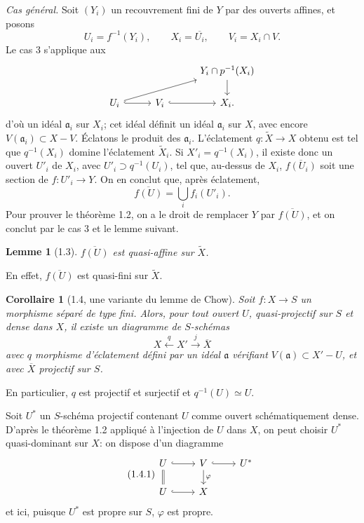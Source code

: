 \documentclass[10pt,a4paper]{article}
\theoremstyle{deligne}
\newtheorem*{lemma*}{Lemme}
\newtheorem*{corollary*}{Corollaire}
\begin{document}
\textit{Cas général.} Soit \((Y_i)\) un recouvrement fini de \(Y\) par des ouverts affines, et posons
\[
U_i=f^{-1}(Y_i),\qquad X_i=\overline{U_i},\qquad V_i=X_i\cap V.
\]
Le cas 3 s'applique aux
\[
\begin{tikzcd}[column sep=2.8em,row sep=1.6em]
&& Y_i\cap p^{-1}(X_i) \arrow[d] \\
U_i \arrow[r,hook] \arrow[urr] & V_i \arrow[r,hook] & X_i .
\end{tikzcd}
\]
d'où un idéal \(\mathfrak a_i\) sur \(X_i\); cet idéal définit un idéal \(\mathfrak a_i\) sur \(X\), avec encore \(V(\mathfrak a_i)\subset X-V\). Éclatons le produit des \(\mathfrak a_i\). L'éclatement \(q:\widetilde X\to X\) obtenu est tel que \(q^{-1}(X_i)\) domine l'éclatement \(\widetilde X_i\). Si \(X'_i=q^{-1}(X_i)\), il existe donc un ouvert \(U'_i\) de \(X_i\), avec \(U'_i\supset q^{-1}(U_i)\), tel que, au-dessus de \(X_i\), \(\overline{f(U_i)}\) soit une section de \(f:U'_i\to Y\). On en conclut que, après éclatement,
\[
\overline{f(U)}=\bigcup_i f_i(U'_i).
\]
Pour prouver le théorème 1.2, on a le droit de remplacer \(Y\) par \(\overline{f(U)}\), et on conclut par le cas 3 et le lemme suivant.

\begin{lemma*}[1.3]
\(\overline{f(U)}\) est quasi-affine sur \(\widetilde X\).
\end{lemma*}
En effet, \(\overline{f(U)}\) est quasi-fini sur \(\widetilde X\).

\begin{corollary*}[1.4, une variante du lemme de Chow]
Soit \(f:X\to S\) un morphisme séparé de type fini. Alors, pour tout ouvert \(U\), quasi-projectif sur \(S\) et dense dans \(X\), il existe un diagramme de \(S\)-schémas
\[
X \xleftarrow{q} X' \xrightarrow{j} \overline X
\]
avec \(q\) morphisme d'éclatement défini par un idéal \(\mathfrak a\) vérifiant \(V(\mathfrak a)\subset X'-U\), et avec \(\overline X\) projectif sur \(S\).
\end{corollary*}
En particulier, \(q\) est projectif et surjectif et \(q^{-1}(U)\simeq U\).

Soit \(U^*\) un \(S\)-schéma projectif contenant \(U\) comme ouvert schématiquement dense. D'après le théorème 1.2 appliqué à l'injection de \(U\) dans \(X\), on peut choisir \(U^*\) quasi-dominant sur \(X\): on dispose d'un diagramme
\[
\tag{1.4.1}
\begin{tikzcd}[column sep=2.4em,row sep=1.5em]
U \arrow[r,hook] \arrow[d,equal] & V \arrow[r,hook] \arrow[d,"\varphi"] & U^* \\
U \arrow[r,hook] & X
\end{tikzcd}
\]
et ici, puisque \(U^*\) est propre sur \(S\), \(\varphi\) est propre.
\end{document}
